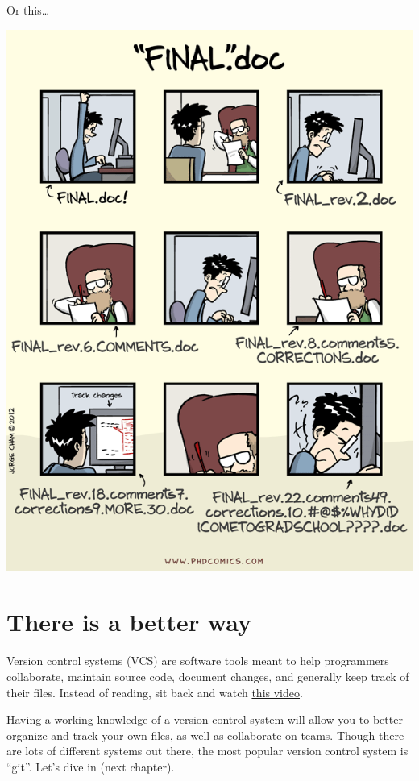 \documentclass[
]{book}
\begin{document}
Or this\ldots{}

\includegraphics{img/version_control_2.png}

\hypertarget{there-is-a-better-way}{%
\section*{There is a better way}\label{there-is-a-better-way}}

Version control systems (VCS) are software tools meant to help programmers collaborate, maintain source code, document changes, and generally keep track of their files. Instead of reading, sit back and watch \href{https://youtu.be/9GKpbI1siow}{this video}.

Having a working knowledge of a version control system will allow you to better organize and track your own files, as well as collaborate on teams. Though there are lots of different systems out there, the most popular version control system is ``git''. Let's dive in (next chapter).
\end{document}
